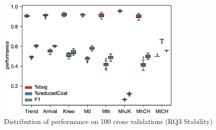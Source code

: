 \begin{figure}[t!]
\centering
\includegraphics[width=9cm]{figure/stable.eps}
\caption{Distribution of performance on 100 cross validations (RQ3 Stability)}
\label{fig:stable}
\end{figure}

